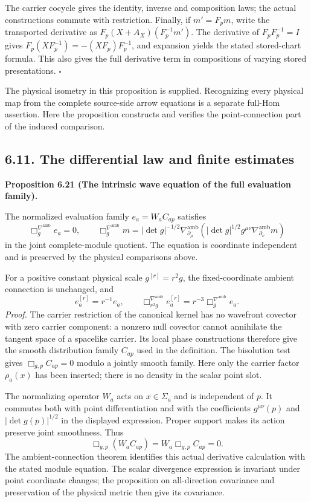 \documentclass[
  english,
  11pt,
  reqno]{amsart}
\makeatletter
\newcommand{\paperdisplaynext}{%
  \let\paper@savedstartsection\@startsection
  \def\@startsection##1##2##3##4##5##6{%
    \let\@startsection\paper@savedstartsection
    \@tempskipa ##5\relax
    \ifdim\@tempskipa<\z@
      \def\paper@afterskip{.35\baselineskip}%
    \else
      \def\paper@afterskip{##5}%
    \fi
    \@startsection{##1}{##2}{##3}{##4}{\paper@afterskip}{##6}}}
\newcommand{\paperdisplaysection}{\paperdisplaynext\subsection}
\newcommand{\pandocstatementheading}[1]{%
  \par\if@nobreak\else
    \addpenalty{\@beginparpenalty}%
    \addvspace{.5\baselineskip plus .2\baselineskip minus .2\baselineskip}%
  \fi
  {\normalfont\bfseries #1\par}%
  \nobreak\@afterindenttrue\@afterheading
}
\let\paper@displaysection\paperdisplaysection
\renewcommand{\paperdisplaysection}[1]{%
  \let\paper@savedhangfrom\@hangfrom
  \long\def\@hangfrom##1##2{%
    \paper@savedhangfrom{##1}{\paper@headingparagraph##2}}%
  \paper@displaysection{#1}%
  \let\@hangfrom\paper@savedhangfrom}
\makeatother
\begin{document}
The carrier cocycle gives the identity, inverse and composition laws;
the actual constructions commute with restriction. Finally, if
\(m'=F_pm\), write the transported derivative as
\(F_p(X+A_X)(F_p^{-1}m')\). The derivative of \(F_pF_p^{-1}=I\) gives
\(F_p(XF_p^{-1})=-(XF_p)F_p^{-1}\), and expansion yields the stated
stored-chart formula. This also gives the full derivative term in
compositions of varying stored presentations. \hfill\(\square\)

The physical isometry in this proposition is supplied. Recognizing every
physical map from the complete source-side arrow equations is a separate
full-Hom assertion. Here the proposition constructs and verifies the
point-connection part of the induced comparison.

\paperdisplaysection{6.11. The differential law and finite
estimates}\label{the-differential-law-and-finite-estimates}\label{sec:online-evaluation-wave-differential-law}

\pandocstatementheading{\leavevmode{}\label{prop:online-evaluation-wave-equation}Proposition 6.21 (The intrinsic wave equation of the full evaluation
family).}

The normalized evaluation family \(e_a=W_aC_{ap}\) satisfies%
 \[
\Box_g^{\nabla^{\mathrm{amb}}}e_a=0,
\qquad
\Box_g^{\nabla^{\mathrm{amb}}}m
=|\det g|^{-1/2}
\nabla^{\mathrm{amb}}_{\partial_\mu}
\left(|\det g|^{1/2}g^{\mu\nu}
\nabla^{\mathrm{amb}}_{\partial_\nu}m\right)
\] in the joint complete-module quotient. The equation is coordinate
independent and is preserved by the physical comparisons above.

For a positive constant physical scale \(g^{[r]}=r^2g\), the
fixed-coordinate ambient connection is unchanged, and%
 \[
e_a^{[r]}=r^{-1}e_a,
\qquad
\Box_{r^2g}^{\nabla^{\mathrm{amb}}}e_a^{[r]}
=r^{-3}\Box_g^{\nabla^{\mathrm{amb}}}e_a.
\] \emph{Proof.} The carrier restriction of the canonical kernel has no
wavefront covector with zero carrier component: a nonzero null covector
cannot annihilate the tangent space of a spacelike carrier. Its local
phase constructions therefore give the smooth distribution family
\(C_{ap}\) used in the definition. The bisolution test gives
\(\Box_{g,p}C_{ap}=0\) modulo a jointly smooth family. Here only the
carrier factor \(\rho_a(x)\) has been inserted; there is no density in
the scalar point slot.

The normalizing operator \(W_a\) acts on \(x\in\Sigma_a\) and is
independent of \(p\). It commutes both with point differentiation and
with the coefficients \(g^{\mu\nu}(p)\) and \(|\det g(p)|^{1/2}\) in the
displayed expression. Proper support makes its action preserve joint
smoothness. Thus \[
\Box_{g,p}(W_aC_{ap})
=W_a\Box_{g,p}C_{ap}=0.
\] The ambient-connection theorem identifies this actual derivative
calculation with the stated module equation. The scalar divergence
expression is invariant under point coordinate changes; the proposition
on all-direction covariance and preservation of the physical metric then
give its covariance.
\end{document}
